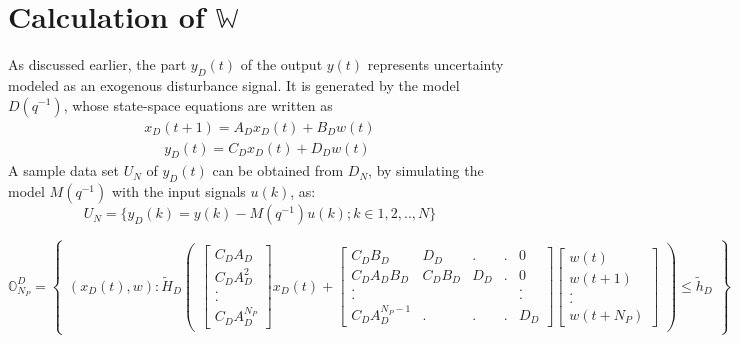 \documentclass[letterpaper, 10 pt, conference]{ieeeconf}  %
\begin{document}
  \section{Calculation of $\mathbb{W}$}
  \noindent
  As discussed earlier, the part $y_D(t)$ of the output $y(t)$ represents uncertainty modeled as an exogenous disturbance signal. It is generated by the model $D(q^{-1})$, whose state-space equations are written as 
  \begin{equation}
  \begin{matrix}
  x_D(t+1) = A_Dx_D(t)+B_Dw(t)  \\ \hspace{17pt}
  y_D(t) = C_Dx_D(t)+D_Dw(t)
  \end{matrix}
  \label{ssD}
  \end{equation}
  A sample data set $U_N$ of $y_D(t)$ can be obtained from $D_N$, by simulating the model $M(q^{-1})$ with the input signals $u(k)$, as:
  \begin{equation}
  U_N=\{y_D(k)=y(k)-M(q^{-1})u(k);k \in 1,2,..,N\}
  \end{equation}
  \begin{table}[t]
   \begin{equation}
   \mathbb{O}_{N_P}^D=\begin{Bmatrix}(x_D(t),w):\tilde{H}_D\begin{pmatrix}\begin{bmatrix} C_DA_D\\ C_DA_D^2 \\ . \\ . \\ C_DA_D^{N_P}\end{bmatrix}x_D(t) + \begin{bmatrix}
   C_DB_D & D_D & . & . & 0 \\
   C_DA_DB_D & C_DB_D & D_D & . & 0 \\
   . &  &  &  & . \\
   . &  &  &  & . \\
   C_DA_D^{N_P-1} & . & . & . & D_D
   \end{bmatrix}
   \begin{bmatrix}
   w(t) \\ w(t+1) \\ . \\ . \\ w(t+N_P)
   \end{bmatrix}
   \end{pmatrix} \leq \tilde{h}_D
   \end{Bmatrix}
   \label{OND_set}
   \end{equation} 
  \end{table}
\end{document}
